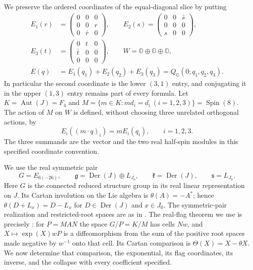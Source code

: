 We preserve the ordered coordinates of the equal-diagonal slice by putting
\begin{equation}
 \begin{aligned}
 E_1(r)&=\begin{pmatrix}0&0&0\\0&0&r\\0&\bar r&0\end{pmatrix},\qquad
 E_2(s)=\begin{pmatrix}0&0&\bar s\\0&0&0\\s&0&0\end{pmatrix},\\
 E_3(t)&=\begin{pmatrix}0&t&0\\\bar t&0&0\\0&0&0\end{pmatrix},\qquad
 W=\mathbb O\oplus\mathbb O\oplus\mathbb O,\\
 E(q)&=E_1(q_1)+E_2(q_2)+E_3(q_3)
      =Q_{\mathbb O}(0;q_1,q_2,q_3).
 \end{aligned}
 \label{h24:fc:coordinate-operators}
\end{equation}
In particular the second coordinate is the lower $(3,1)$ entry, and
conjugating it in the upper $(1,3)$ entry remains part of every formula.
Let $K=\operatorname{Aut}(J)=F_4$ and
$M=\{m\in K:m d_i=d_i\ (i=1,2,3)\}=\operatorname{Spin}(8)$.
The action of $M$ on $W$ is defined, without choosing three unrelated
orthogonal actions, by
\begin{equation}
 E_i((m\cdot q)_i)=mE_i(q_i),\qquad i=1,2,3.
 \label{h24:fc:triality-action}
\end{equation}
The three summands are the vector and the two real half-spin modules in
this specified coordinate convention.

We use the real symmetric pair
\[
 G=E_{6(-26)},\qquad
 \mathfrak g=\operatorname{Der}(J)\oplus L_{J_0},\qquad
 \mathfrak k=\operatorname{Der}(J),\qquad
 \mathfrak s=L_{J_0}.
\]
Here $G$ is the connected reduced structure group in its real linear
representation on $J$. Its Cartan involution on the Lie algebra is
$\theta(A)=-A^*$; hence
$\theta(D+L_x)=D-L_x$ for $D\in\operatorname{Der}(J)$ and $x\in J_0$.
The symmetric-pair realization and restricted-root spaces are as in
\cite[Section~2.6, pp.~491--493]{h24:MareWillems2013}.
The real-flag theorem we use is precisely
\cite[Appendix~B, Theorem~B.2, Proposition~B.3 and Corollary~B.4,
p.~519]{h24:MareWillems2013}: for $P=MAN$ the space $G/P=K/M$
has cells $Nw$, and $X\mapsto\exp(X)wP$ is a diffeomorphism from
the sum of the positive root spaces made negative by $w^{-1}$ onto
that cell. Its Cartan comparison is $\Theta(X)=X-\theta X$.
We now determine that comparison, the exponential, its flag coordinates,
its inverse, and the collapse with every coefficient specified.

